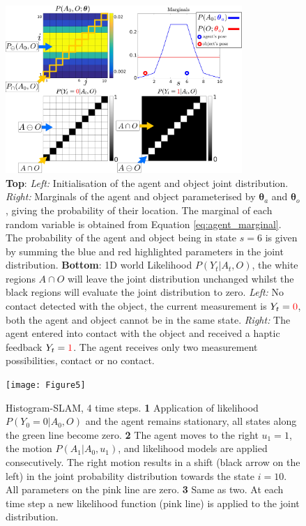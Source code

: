 \documentclass{frontiersSCNS} %
\newcommand{\ThA}{\boldsymbol{\theta}_a}
\newcommand{\ThO}{\boldsymbol{\theta}_o}
\begin{document}
\begin{figure}
 \centering
 \includegraphics[width=0.8\textwidth]{Figure4}
 \caption{\textbf{Top}: \textit{Left:} Initialisation of the agent and object joint distribution. 
 \textit{Right:} Marginals of the agent and object parameterised by $\ThA$ and $\ThO$, giving the probability of their location. The marginal of each 
 random variable is obtained from Equation \ref{eq:agent_marginal}. The probability of
 the agent and object being in state $s=6$ is given by summing the blue and red highlighted parameters in the joint distribution. 
 \textbf{Bottom}: 1D world Likelihood $P(Y_t|A_t,O)$, the white regions $A \cap O$ will leave the joint distribution unchanged whilst
 the black regions will evaluate the joint distribution to zero. \textit{Left:} No contact detected with the object, the current measurement 
 is $Y_t = \textcolor{red}0$, both the agent and object cannot be in the same state. \textit{Right:} The agent 
 entered into contact with the object and received a haptic feedback $Y_t = \textcolor{red}1$. The agent receives 
 only two measurement possibilities, contact or no contact.
 }
 \label{fig:histogram_joint}
\end{figure}

\begin{figure}
 \centering
  \texttt{[image: Figure5]}
  \caption{Histogram-SLAM, 4 time steps. \textbf{1} Application of likelihood $P(Y_0=0|A_0,O)$ and the agent remains stationary, all states along the green line become zero.
  \textbf{2} The agent moves to the right $u_1=1$, the motion $P(A_1|A_0,u_1)$, and likelihood models are applied consecutively. The right motion results in a shift (black arrow on the left) in the joint probability 
  distribution towards the state $i=10$. All parameters on the pink line are zero. \textbf{3} Same as two. At each time step a new likelihood function (pink line) is applied to the joint distribution.}
  \label{fig:discrete_example}
\end{figure}
\end{document}
